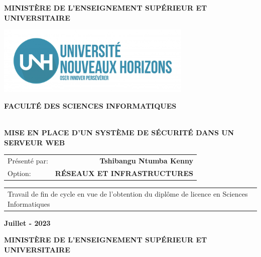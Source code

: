 
	\author{Tshibangu Ntumba Kenny}
	
	
	
	\thispagestyle{empty}
	
	\begin{center}
		\textbf{\large MINISTÈRE DE L'ENSEIGNEMENT SUPÉRIEUR ET UNIVERSITAIRE}
	\end{center}
	
	\begin{center}
		\includegraphics[width=0.7\textwidth]{PhotoMemoire/Logo.jpg}
	\end{center}
	
	\begin{center}
		\textbf{\large FACULTÉ DES SCIENCES INFORMATIQUES}
	\end{center}
	
	\vspace{2cm}
	\begin{center}
		\hrulefill  \\
		\large{
			\textbf{
			  MISE EN PLACE D'UN SYSTÈME DE SÉCURITÉ DANS UN SERVEUR WEB
			}
		} \\
		\hrulefill
	\end{center}
	
	\vspace{0.5cm}
	\hfill
	\begin{tabular}{lr}
		Présenté par: & \textbf{Tshibangu Ntumba Kenny} \\
		Option: & \textbf{RÉSEAUX ET INFRASTRUCTURES} \\
	\end{tabular}
	
	\vspace{0.5cm}
	\hfill
	\begin{tabular}{p{9.5cm}}
		Travail de fin de cycle en vue de l'obtention du diplôme de licence en Sciences Informatiques
	\end{tabular}
	
	\vfill
	\begin{center}
		\large{
			\textbf{
			Juillet - 2023
			}
		}
	\end{center}
	\newpage
	\thispagestyle{empty}
\begin{center}
	\textbf{\large MINISTÈRE DE L'ENSEIGNEMENT SUPÉRIEUR ET UNIVERSITAIRE}
\end{center}

